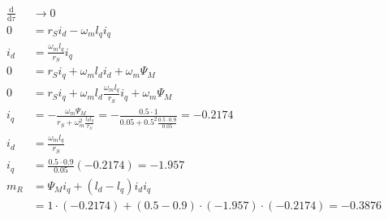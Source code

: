 \documentclass[11pt,a4paper]{scrartcl}
\newcommand{\mybr}[1]{\left(#1\right)}
\newcommand{\0}{_{\mybr{0}}}
\newcommand{\1}{_{\mybr{1}}}
\newcommand{\2}{_{\mybr{2}}}
\renewcommand{\d}{\mathrm{d}}
\begin{document}
\subsection{}
\begin{align}
\frac{\d}{\d\tau} &\rightarrow 0\\
0&=r_S i_d -\omega_m l_q i_q\\
i_d&=\frac{\omega_m l_q}{r_S} i_q\\
0&=r_S i_q+\omega_m l_d i_d + \omega_m\Psi_M \\
0&=r_S i_q+\omega_m l_d \frac{\omega_m l_q}{r_S} i_q + \omega_m\Psi_M \\
i_q&=-\frac{\omega_m \Psi_M}{r_S+\omega_m^2\frac{l_d l_q}{r_S}}=-\frac{\num{0.5}\cdot 1}{\num{0.05}+\num{0.5}^2\frac{\num{0.5}\cdot\num{0.9}}{\num{0.05}}}=\num{-0.2174}\\
i_d&=\frac{\omega_m l_q}{r_S}\\ i_q&=\frac{\num{0.5}\cdot\num{0.9}}{\num{0.05}}\mybr{\num{-0.2174}}=\num{-1.957}\\
m_R&=\Psi_M i_q+\mybr{l_d-l_q}i_d i_q\\
&=1\cdot\mybr{\num{-0.2174}}+\mybr{\num{0.5}-\num{0.9}}\cdot\mybr{\num{-1.957}}\cdot\mybr{{\num{-0.2174}}}=\num{-0.3876}
\end{align}


\end{document}
